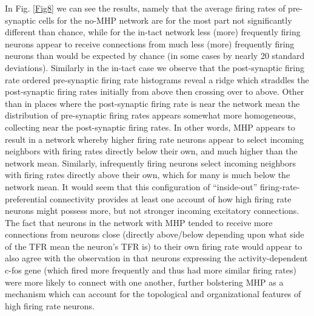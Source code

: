\documentclass[10pt,letterpaper]{article}
\begin{document}
 In Fig. \ref{Fig8} we can see the results, namely that the average firing rates of pre-synaptic cells for the no-MHP network are for the most part not significantly different than chance, while for the in-tact network less (more) frequently firing neurons appear to receive connections from much less (more) frequently firing neurons than would be expected by chance (in some cases by nearly 20 standard deviations). Similarly in the in-tact case we observe that the post-synaptic firing rate ordered pre-synaptic firing rate histograms reveal a ridge which straddles the post-synaptic firing rates initially from above then crossing over to above. Other than in places where the post-synaptic firing rate is near the network mean the distribution of pre-synaptic firing rates appears somewhat more homogeneous, collecting near the post-synaptic firing rates. In other words, MHP appears to result in a network whereby higher firing rate neurons appear to select incoming neighbors with firing rates directly below their own, and much higher than the network mean. Similarly, infrequently firing neurons select incoming neighbors with firing rates directly above their own, which for many is much below the network mean. It would seem that this configuration of ``inside-out'' firing-rate-preferential connectivity provides at least one account of how high firing rate neurons might possess more, but not stronger incoming excitatory connections. The fact that neurons in the network with MHP tended to receive more connections from neurons close (directly above/below depending upon what side of the TFR mean the neuron's TFR is) to their own firing rate would appear to also agree with the observation in \cite{yassin2010embedded} that neurons expressing the activity-dependent c-fos gene (which fired more frequently and thus had more similar firing rates) were more likely to connect with one another, further bolstering MHP as a mechanism which can account for the topological and organizational features of high firing rate neurons. 
  
\end{document}
